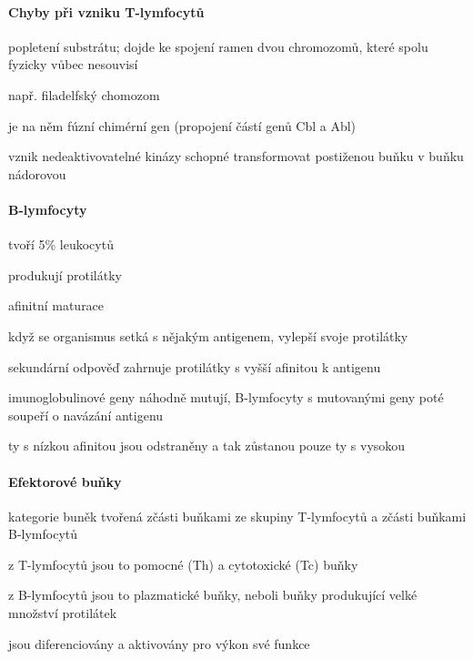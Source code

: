 \documentclass[DIV=8]{scrreprt}
\begin{document}
\paragraph{Chyby při vzniku T-lymfocytů}
\begin{myItemize}[nosep]
    \item popletení substrátu; dojde ke spojení ramen dvou chromozomů, které spolu fyzicky vůbec nesouvisí
    \item např. filadelfský chomozom
\begin{myItemize}[nosep]
    \item je na něm fúzní chimérní gen (propojení částí genů Cbl a Abl)
    \item vznik nedeaktivovatelné kinázy schopné transformovat postiženou buňku v buňku nádorovou
\end{myItemize}

\end{myItemize}



\paragraph{B-lymfocyty}
\begin{myItemize}[nosep]
    \item tvoří 5\% leukocytů
    \item produkují protilátky
    \item afinitní maturace
\begin{myEnumerate}[nosep]
    \item když se organismus setká s nějakým antigenem, vylepší svoje protilátky
    \item sekundární odpověď zahrnuje protilátky s vyšší afinitou k antigenu
    \item imunoglobulinové geny náhodně mutují, B-lymfocyty s mutovanými geny poté soupeří o navázání antigenu
    \item ty s nízkou afinitou jsou odstraněny a tak zůstanou pouze ty s vysokou
\end{myEnumerate}

\end{myItemize}



\paragraph{Efektorové buňky}
\begin{myItemize}[nosep]
    \item kategorie buněk tvořená zčásti buňkami ze skupiny T-lymfocytů a zčásti buňkami B-lymfocytů
\begin{myItemize}[nosep]
    \item z T-lymfocytů jsou to pomocné (Th) a cytotoxické (Tc) buňky
    \item z B-lymfocytů jsou to plazmatické buňky, neboli buňky produkující velké množství protilátek
\end{myItemize}

    \item jsou diferenciovány a aktivovány pro výkon své funkce
\end{myItemize}
\end{document}

